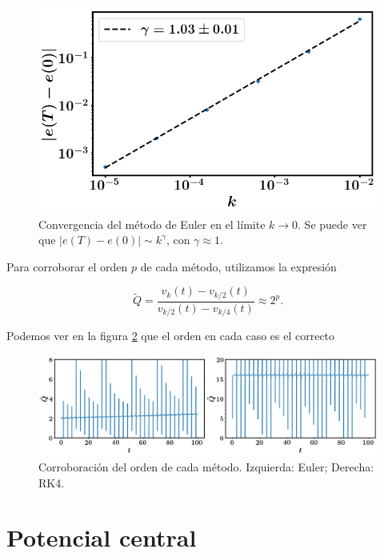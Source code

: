 \documentclass[12pt]{article}
\begin{document}
\begin{figure}
\centering
\includegraphics[scale=0.33]{convergencia.png}
\caption{\label{fig:convergencia} Convergencia del m\'etodo de Euler en el l\'imite $k\rightarrow 0$. Se puede ver que $|e(T)-e(0)|\sim k^{\gamma}$, con $\gamma \approx 1$.}
\end{figure}

Para corroborar el orden $p$ de cada m\'etodo, utilizamos la expresi\'on \cite{Kreiss-Ortiz}

\begin{equation}
\tilde{Q} = \dfrac{v_k(t)-v_{k/2}(t)}{v_{k/2}(t)-v_{k/4}(t)} \approx 2^p.
\end{equation}

Podemos ver en la figura \ref{fig:orden} que el orden en cada caso es el correcto

\begin{figure}
\centering
\includegraphics[scale=0.33]{orden.png}
\caption{\label{fig:orden} Corroboraci\'on del orden de cada m\'etodo. Izquierda: Euler; Derecha: RK4.}
\end{figure}

\pagebreak

\section{Potencial central}
\end{document}
